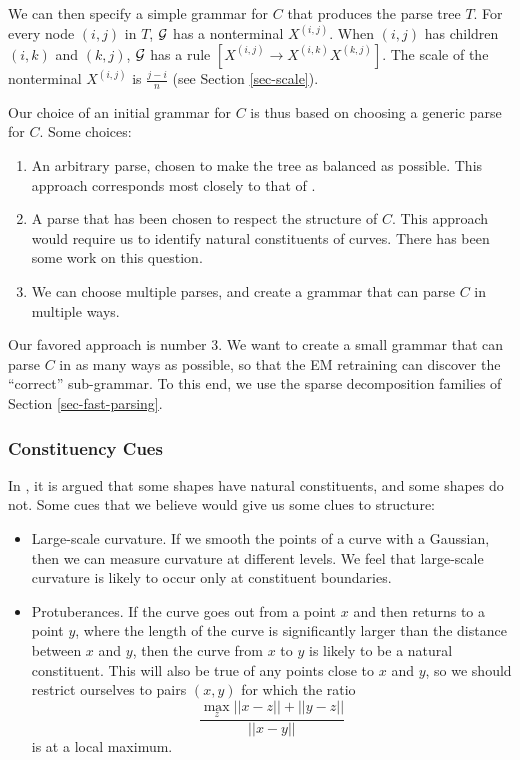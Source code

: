 \documentclass{article}
\begin{document}
We can then specify a simple grammar for $C$ that produces the parse
tree $T$. For every node $(i,j)$ in $T$, ${\mathcal G}$ has a nonterminal
$X^{(i,j)}$. When $(i,j)$ has children $(i,k)$ and $(k,j)$, ${\mathcal G}$ has
a rule $[X^{(i,j)} \to X^{(i,k)}X^{(k,j)}]$. The scale of the
nonterminal $X^{(i,j)}$ is $\frac{j-i}{n}$ (see Section \ref{sec-scale}).

Our choice of an initial grammar for $C$ is thus based on choosing a
generic parse for $C$. Some choices:
\begin{enumerate}
\item An arbitrary parse, chosen to make the tree as balanced as
  possible. This approach corresponds most closely to that of
  \cite{hcm}.
\item A parse that has been chosen to respect the structure of
  $C$. This approach would require us to identify natural constituents
  of curves. There has been some work on this question.
\item We can choose multiple parses, and create a grammar that can
  parse $C$ in multiple ways. 
\end{enumerate}

Our favored approach is number 3. We want to create a small grammar
that can parse $C$ in as many ways as possible, so that the EM
retraining can discover the ``correct'' sub-grammar. To this end, we
use the sparse decomposition families of Section
\ref{sec-fast-parsing}.

\subsubsection{Constituency Cues}
In \cite{basri-jacobs}, it is argued that some shapes have natural
constituents, and some shapes do not. Some cues that we believe would
give us some clues to structure: 
\begin{itemize}
\item Large-scale curvature. If we smooth the points of a curve with a
  Gaussian, then we can measure curvature at different levels. We feel
  that large-scale curvature is likely to occur only at constituent
  boundaries.
\item Protuberances. If the curve goes out from a point $x$ and then
  returns to a point $y$, where the length of the curve is
  significantly larger than the distance between $x$ and $y$, then the
  curve from $x$ to $y$ is likely to be a natural constituent. This
  will also be true of any points close to $x$ and $y$, so we should
  restrict ourselves to pairs $(x,y)$ for which the ratio 
$$\frac{\max_{z}||x-z|| + ||y-z||}{||x-y||}$$
is at a local maximum.
\end{itemize}
\end{document}
